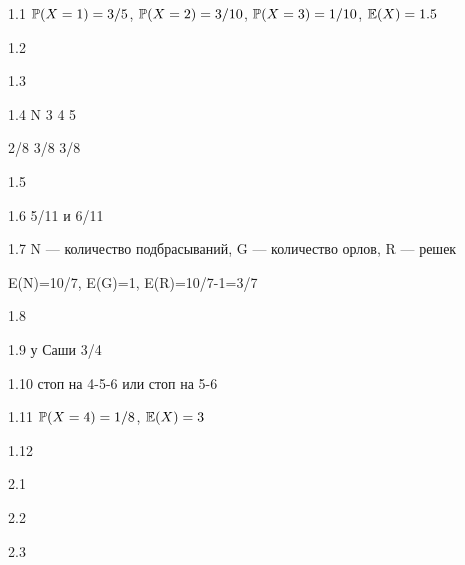 \protect \hypertarget {soln:1.1}{}
\begin{solution}{{1.1}}
  $\P(X=1)=3/5$, $\P(X=2)=3/10$, $\P(X=3)=1/10$, $\E(X)=1.5$
\end{solution}
\protect \hypertarget {soln:1.2}{}
\begin{solution}{{1.2}}
\end{solution}
\protect \hypertarget {soln:1.3}{}
\begin{solution}{{1.3}}
\end{solution}
\protect \hypertarget {soln:1.4}{}
\begin{solution}{{1.4}}
   N 3 4 5

  2/8 3/8 3/8
\end{solution}
\protect \hypertarget {soln:1.5}{}
\begin{solution}{{1.5}}
\end{solution}
\protect \hypertarget {soln:1.6}{}
\begin{solution}{{1.6}}
  5/11 и 6/11
\end{solution}
\protect \hypertarget {soln:1.7}{}
\begin{solution}{{1.7}}
  N — количество подбрасываний, G — количество орлов, R — решек

  E(N)=10/7, E(G)=1, E(R)=10/7-1=3/7
\end{solution}
\protect \hypertarget {soln:1.8}{}
\begin{solution}{{1.8}}
\end{solution}
\protect \hypertarget {soln:1.9}{}
\begin{solution}{{1.9}}
  у Саши 3/4
\end{solution}
\protect \hypertarget {soln:1.10}{}
\begin{solution}{{1.10}}
  стоп на 4-5-6 или стоп на 5-6
\end{solution}
\protect \hypertarget {soln:1.11}{}
\begin{solution}{{1.11}}
  $\P(X=4)=1/8$, $\E(X)=3$
\end{solution}
\protect \hypertarget {soln:1.12}{}
\begin{solution}{{1.12}}
\end{solution}
\protect \hypertarget {soln:2.1}{}
\begin{solution}{{2.1}}
\end{solution}
\protect \hypertarget {soln:2.2}{}
\begin{solution}{{2.2}}
\end{solution}
\protect \hypertarget {soln:2.3}{}
\begin{solution}{{2.3}}
\end{solution}
